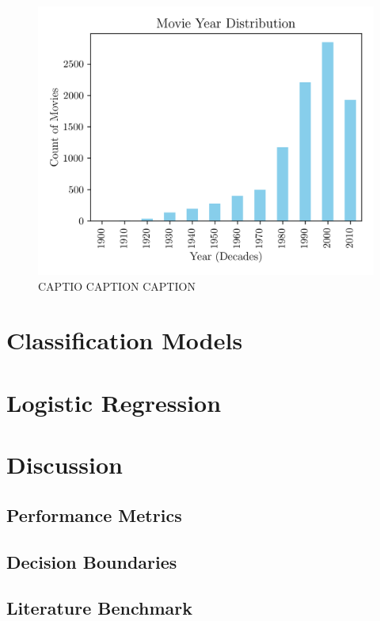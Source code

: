 \documentclass[conference]{IEEEtran}
\begin{document}
\begin{figure}[H]
    \centering
    \includegraphics[width=1\linewidth]{assets/year_distribution.png}
    \caption{CAPTIO CAPTION CAPTION}
    \label{fig:year_distribution}
\end{figure}



\section{Classification Models}


\section{Logistic Regression}




\section{Discussion} \label{discussion_sec}
\subsection{Performance Metrics}


\subsection{Decision Boundaries}


\subsection{Literature Benchmark}
\end{document}

